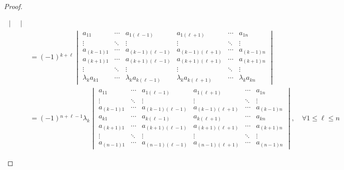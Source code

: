 \documentclass[class=linearalgebra,crop=false]{standalone}
\begin{document}
\begin{proof}
\begin{enumerate}[label = \textbf{Trường hợp \arabic*.},itemindent=2cm]
\begin{align*}
\begin{vmatrix}
                  \end{vmatrix}                             \\
                                    & = (-1){}^{k+\ell}
                  \begin{vmatrix}
                      a_{11}            & \cdots & a_{1(\ell-1)}            & a_{1(\ell+1)}            & \cdots & a_{1n}            \\
                      \vdots            & \ddots & \vdots                   & \vdots                   & \ddots & \vdots            \\
                      a_{(k-1)1}        & \cdots & a_{(k-1)(\ell-1)}        & a_{(k-1)(\ell+1)}        & \cdots & a_{(k-1)n}        \\
                      a_{(k+1)1}        & \cdots & a_{(k+1)(\ell-1)}        & a_{(k+1)(\ell+1)}        & \cdots & a_{(k+1)n}        \\
                      \vdots            & \ddots & \vdots                   & \vdots                   & \ddots & \vdots            \\
                      \lambda_{k}a_{k1} & \cdots & \lambda_{k}a_{k(\ell-1)} & \lambda_{k}a_{k(\ell+1)} & \cdots & \lambda_{k}a_{kn}
                  \end{vmatrix} \\
                                    & = (-1){}^{n+\ell-1}\lambda_{k}
                  \begin{vmatrix}
                      a_{11}     & \cdots & a_{1(\ell-1)}     & a_{1(\ell+1)}     & \cdots & a_{1n}     \\
                      \vdots     & \ddots & \vdots            & \vdots            & \ddots & \vdots     \\
                      a_{(k-1)1} & \cdots & a_{(k-1)(\ell-1)} & a_{(k-1)(\ell+1)} & \cdots & a_{(k-1)n} \\
                      a_{k1}     & \cdots & a_{k(\ell-1)}     & a_{k(\ell+1)}     & \cdots & a_{kn}     \\
                      a_{(k+1)1} & \cdots & a_{(k+1)(\ell-1)} & a_{(k+1)(\ell+1)} & \cdots & a_{(k+1)n} \\
                      \vdots     & \ddots & \vdots            & \vdots            & \ddots & \vdots     \\
                      a_{(n-1)1} & \cdots & a_{(n-1)(\ell-1)} & a_{(n-1)(\ell+1)} & \cdots & a_{(n-1)n}
                  \end{vmatrix}, \quad\forall 1\le\ell\le n

\end{align*}
\end{enumerate}
\end{proof}
\end{document}
